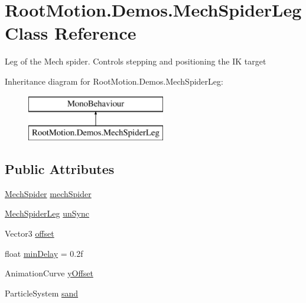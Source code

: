 \hypertarget{class_root_motion_1_1_demos_1_1_mech_spider_leg}{}\section{Root\+Motion.\+Demos.\+Mech\+Spider\+Leg Class Reference}
\label{class_root_motion_1_1_demos_1_1_mech_spider_leg}


Leg of the Mech spider. Controls stepping and positioning the IK target  


Inheritance diagram for Root\+Motion.\+Demos.\+Mech\+Spider\+Leg\+:\begin{figure}[H]
\begin{center}
\leavevmode
\includegraphics[height=2.000000cm]{class_root_motion_1_1_demos_1_1_mech_spider_leg}
\end{center}
\end{figure}
\subsection*{Public Attributes}
\begin{DoxyCompactItemize}
\item 
\mbox{\hyperlink{class_root_motion_1_1_demos_1_1_mech_spider}{Mech\+Spider}} \mbox{\hyperlink{class_root_motion_1_1_demos_1_1_mech_spider_leg_ab5a0a85fd7a44f1a79f9bac591dab9a5}{mech\+Spider}}
\item 
\mbox{\hyperlink{class_root_motion_1_1_demos_1_1_mech_spider_leg}{Mech\+Spider\+Leg}} \mbox{\hyperlink{class_root_motion_1_1_demos_1_1_mech_spider_leg_a85c7cabafb3b7b718e300a5a62e6cc02}{un\+Sync}}
\item 
Vector3 \mbox{\hyperlink{class_root_motion_1_1_demos_1_1_mech_spider_leg_a9094549666f374f5c5259a5b2e33acc0}{offset}}
\item 
float \mbox{\hyperlink{class_root_motion_1_1_demos_1_1_mech_spider_leg_ad97fc136036834c447e6bec5ed500264}{min\+Delay}} = 0.\+2f
\item 
Animation\+Curve \mbox{\hyperlink{class_root_motion_1_1_demos_1_1_mech_spider_leg_adadbec9d63f135123452b4e3e4a748b8}{y\+Offset}}
\item 
Particle\+System \mbox{\hyperlink{class_root_motion_1_1_demos_1_1_mech_spider_leg_a37fc5504078b21af595650595bd1e9ef}{sand}}
\end{DoxyCompactItemize}
